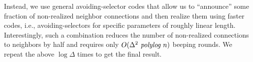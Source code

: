 {Instead, we use general avoiding-selector codes that allow us to ``announce'' some fraction of non-realized neighbor connections and then realize them using faster codes, i.e., avoiding-selectors for specific parameters of roughly linear length. Interestingly, such a combination reduces the number of non-realized connections to neighbors by half and requires only $O(\Delta^2 \text{\em\ polylog } n)$ beeping rounds. We repeat the above $\log\Delta$ times to get the final result.


}